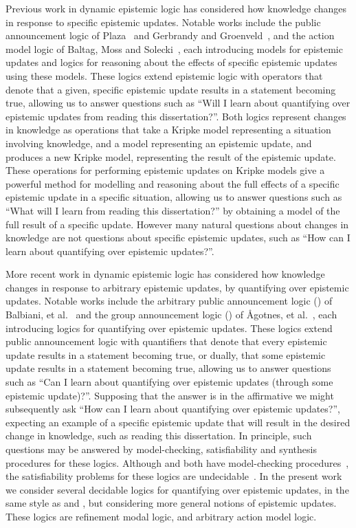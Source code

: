 Previous work in dynamic epistemic logic has considered how knowledge changes in response to specific epistemic updates.
Notable works include the public announcement logic of Plaza~\cite{plaza:1989} and Gerbrandy and Groenveld~\cite{gerbrandy:1997}, and the action model logic of Baltag, Moss and Solecki~\cite{baltag:1998,baltag:2004}, each introducing models for epistemic updates and logics for reasoning about the effects of specific epistemic updates using these models.
These logics extend epistemic logic with operators that denote that a given, specific epistemic update results in a statement becoming true, allowing us to answer questions such as ``Will I learn about quantifying over epistemic updates from reading this dissertation?''.
Both logics represent changes in knowledge as operations that take a Kripke model representing a situation involving knowledge, and a model representing an epistemic update, and produces a new Kripke model, representing the result of the epistemic update.
These operations for performing epistemic updates on Kripke models give a powerful method for modelling and reasoning about the full effects of a specific epistemic update in a specific situation, allowing us to answer questions such as ``What will I learn from reading this dissertation?'' by obtaining a model of the full result of a specific update.
However many natural questions about changes in knowledge are not questions about specific epistemic updates, such as ``How can I learn about quantifying over epistemic updates?''.

More recent work in dynamic epistemic logic has considered how knowledge changes in response to arbitrary epistemic updates, by quantifying over epistemic updates.
Notable works include the arbitrary public announcement logic (\logicApal{}) of Balbiani, et al.~\cite{balbiani:2007} and the group announcement logic (\logicGal{}) of {\AA}gotnes, et al.~\cite{agotnes:2008,agotnes:2010}, each introducing logics for quantifying over epistemic updates.
These logics extend public announcement logic with quantifiers that denote that every epistemic update results in a statement becoming true, or dually, that some epistemic update results in a statement becoming true, allowing us to answer questions such as ``Can I learn about quantifying over epistemic updates (through some epistemic update)?''.
Supposing that the answer is in the affirmative we might subsequently ask ``How can I learn about quantifying over epistemic updates?'', expecting an example of a specific epistemic update that will result in the desired change in knowledge, such as reading this dissertation.
In principle, such questions may be answered by model-checking, satisfiability and synthesis procedures for these logics.
Although \logicApal{} and \logicGal{} both have model-checking procedures~\cite{agotnes:2010}, the satisfiability problems for these logics are undecidable~\cite{agotnes:2014}.
In the present work we consider several decidable logics for quantifying over epistemic updates, in the same style as \logicApal{} and \logicGal{}, but considering more general notions of epistemic updates.
These logics are refinement modal logic, and arbitrary action model logic.

